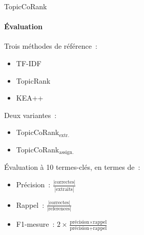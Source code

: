 \begin{frame}{TopicCoRank}\framesubtitle{Évaluation}
  Trois méthodes de référence~:
  \begin{itemize}
    \item{TF-IDF~\cite{salton1975tfidf}}
    \item{TopicRank~\cite{bougouin2013topicrank}}
    \item{KEA++~\cite{medelyan2006kea++}}
  \end{itemize}

  \vspace{1em}

  Deux variantes~:
  \begin{itemize}
    \item{TopicCoRank$_\text{extr.}$}
    \item{TopicCoRank$_\text{assign.}$}
  \end{itemize}

  \vspace{1em}

  Évaluation à 10 termes-clés, en termes de~:
  \begin{itemize}
    \item{Précision~: $\frac{|\text{correctes}|}{|\text{extraits}|}$}
    \item{Rappel~: $\frac{|\text{correctes}|}{|\text{references}|}$}
    \item{F1-mesure~: $2 \times \frac{\text{précision} \times \text{rappel}}{\text{précision} + \text{rappel}}$}
  \end{itemize}
\end{frame}

